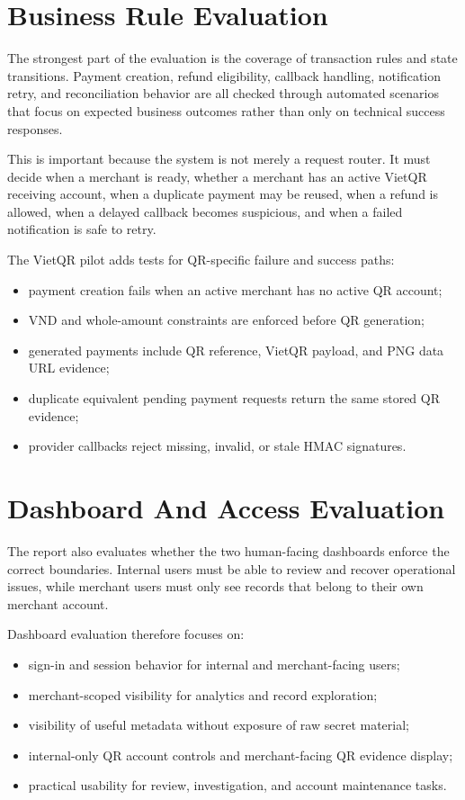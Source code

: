\section{Business Rule Evaluation}

The strongest part of the evaluation is the coverage of transaction rules and
state transitions. Payment creation, refund eligibility, callback handling,
notification retry, and reconciliation behavior are all checked through
automated scenarios that focus on expected business outcomes rather than only on
technical success responses.

This is important because the system is not merely a request router. It must
decide when a merchant is ready, whether a merchant has an active VietQR
receiving account, when a duplicate payment may be reused, when a refund is
allowed, when a delayed callback becomes suspicious, and when a failed
notification is safe to retry.

The VietQR pilot adds tests for QR-specific failure and success paths:

\begin{itemize}
  \item payment creation fails when an active merchant has no active QR account;
  \item VND and whole-amount constraints are enforced before QR generation;
  \item generated payments include QR reference, VietQR payload, and PNG data
  URL evidence;
  \item duplicate equivalent pending payment requests return the same stored QR
  evidence;
  \item provider callbacks reject missing, invalid, or stale HMAC signatures.
\end{itemize}

\section{Dashboard And Access Evaluation}

The report also evaluates whether the two human-facing dashboards enforce the
correct boundaries. Internal users must be able to review and recover
operational issues, while merchant users must only see records that belong to
their own merchant account.

Dashboard evaluation therefore focuses on:

\begin{itemize}
  \item sign-in and session behavior for internal and merchant-facing users;
  \item merchant-scoped visibility for analytics and record exploration;
  \item visibility of useful metadata without exposure of raw secret material;
  \item internal-only QR account controls and merchant-facing QR evidence
  display;
  \item practical usability for review, investigation, and account maintenance
  tasks.
\end{itemize}

